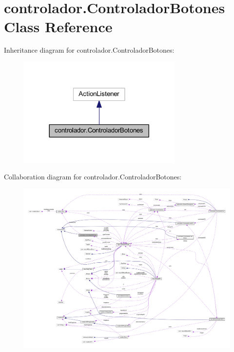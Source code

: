 \hypertarget{classcontrolador_1_1_controlador_botones}{}\section{controlador.\+Controlador\+Botones Class Reference}
\label{classcontrolador_1_1_controlador_botones}


Inheritance diagram for controlador.\+Controlador\+Botones\+:
\nopagebreak
\begin{figure}[H]
\begin{center}
\leavevmode
\includegraphics[width=233pt]{classcontrolador_1_1_controlador_botones__inherit__graph}
\end{center}
\end{figure}


Collaboration diagram for controlador.\+Controlador\+Botones\+:
\nopagebreak
\begin{figure}[H]
\begin{center}
\leavevmode
\includegraphics[width=350pt]{classcontrolador_1_1_controlador_botones__coll__graph}
\end{center}
\end{figure}
